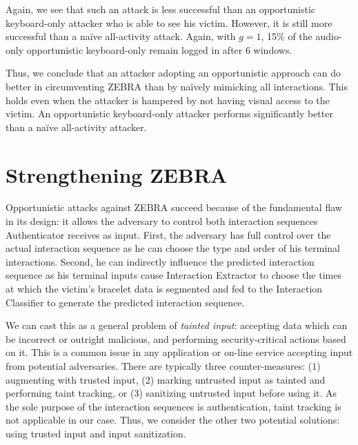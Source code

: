 \documentclass[conference]{IEEEtran}
\newcommand{\zebra}{ZEBRA\xspace}
\newcommand{\KBactivity}{keyboard-only\xspace}
\newcommand{\allactivity}{all-activity\xspace}
\begin{document}
Again, we see that such an attack is less successful than an opportunistic \KBactivity attacker who is able to see his victim. However, it is still more successful than a na\"ive \allactivity attack. Again, with $g=1$, 15\% of the audio-only opportunistic \KBactivity remain logged in after 6 windows.

Thus, we conclude that an attacker adopting an opportunistic approach can do better in circumventing \zebra than by na\"ively mimicking all interactions. This holds even when the attacker is hampered by not having visual access to the victim. An opportunistic \KBactivity attacker performs significantly better than a na\"ive \allactivity attacker.

\fi









 





\section{Strengthening \zebra}
\label{subsec:strengthening}
Opportunistic attacks against \zebra succeed because of the
fundamental flaw in its design: it allows the adversary to control both interaction sequences Authenticator receives as input. First, the adversary has full control over the actual interaction sequence as he can choose the type and order of his terminal interactions. Second, he can indirectly influence the predicted interaction sequence as his terminal inputs cause Interaction Extractor to choose the times at which the victim's bracelet data is segmented and fed to the Interaction Classifier to generate the predicted interaction sequence. 


We can cast this as a general problem of \textit{tainted input}: accepting data which can be incorrect or outright malicious, and performing security-critical actions based on it. This is a common issue in any application or on-line service accepting input from potential adversaries. There are typically three counter-measures: (1) augmenting with trusted input, (2) marking untrusted input as tainted and performing taint tracking, or (3) sanitizing untrusted input before using it. As the sole purpose of the interaction sequences is authentication, taint tracking is not applicable in our case. Thus, we consider the other two potential solutions: using trusted input and input sanitization.
\end{document}
